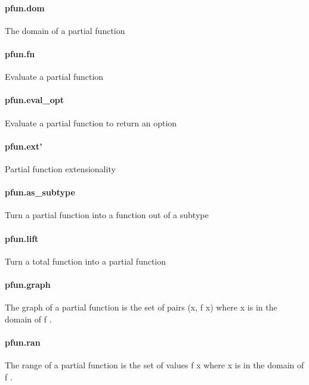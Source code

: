 \documentclass{article}
\begin{document}
\paragraph{pfun.dom}
\par
The domain of a partial function
\paragraph{pfun.fn}
\par
Evaluate a partial function
\paragraph{pfun.eval\_opt}
\par
Evaluate a partial function to return an 
\colorbox[RGB]{253,246,227}{{{{\color[RGB]{101, 123, 131} option }}}}\paragraph{pfun.ext'}
\par
Partial function extensionality
\paragraph{pfun.as\_subtype}
\par
Turn a partial function into a function out of a subtype
\paragraph{pfun.lift}
\par
Turn a total function into a partial function
\paragraph{pfun.graph}
\par
The graph of a partial function is the set of pairs
\colorbox[RGB]{253,246,227}{{{{\color[RGB]{101, 123, 131} (x, f x) }}}} where 
\colorbox[RGB]{253,246,227}{{{{\color[RGB]{101, 123, 131} x }}}} is in the domain of 
\colorbox[RGB]{253,246,227}{{{{\color[RGB]{101, 123, 131} f }}}}.
\paragraph{pfun.ran}
\par
The range of a partial function is the set of values
\colorbox[RGB]{253,246,227}{{{{\color[RGB]{101, 123, 131} f x }}}} where 
\colorbox[RGB]{253,246,227}{{{{\color[RGB]{101, 123, 131} x }}}} is in the domain of 
\colorbox[RGB]{253,246,227}{{{{\color[RGB]{101, 123, 131} f }}}}.
\end{document}
